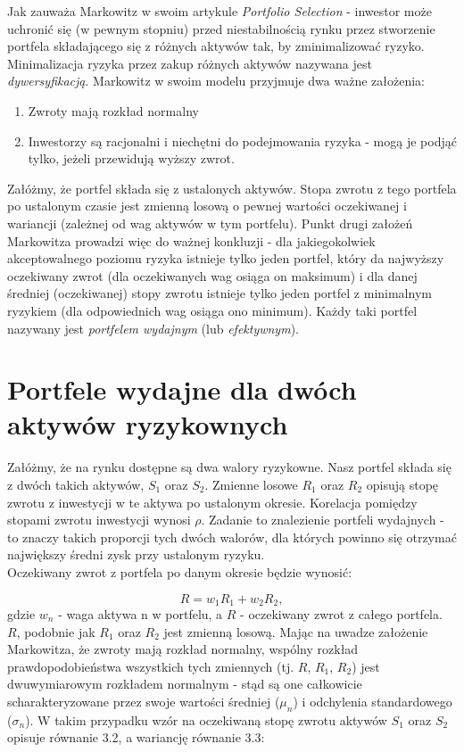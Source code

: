 \documentclass[magister]{dyplom}
\begin{document}
Jak zauważa Markowitz w swoim artykule \textit{Portfolio Selection} - inwestor może uchronić się (w pewnym stopniu) przed niestabilnością rynku przez stworzenie portfela składającego się z różnych aktywów tak, by zminimalizować ryzyko. Minimalizacja ryzyka przez zakup różnych aktywów nazywana jest \textit{dywersyfikacją}. Markowitz w swoim modelu przyjmuje dwa ważne założenia: 

\begin{enumerate}
	\item Zwroty mają rozkład normalny
	\item Inwestorzy są racjonalni i niechętni do podejmowania ryzyka - mogą je podjąć tylko, jeżeli przewidują wyższy zwrot.
\end{enumerate}

Załóżmy, że portfel składa się z ustalonych aktywów. Stopa zwrotu z tego portfela po ustalonym czasie jest zmienną losową o pewnej wartości oczekiwanej i wariancji (zależnej od wag aktywów w tym portfelu).
Punkt drugi założeń Markowitza prowadzi więc do ważnej konkluzji - dla jakiegokolwiek akceptowalnego poziomu ryzyka istnieje tylko jeden portfel, który da najwyższy oczekiwany zwrot (dla oczekiwanych wag osiąga on maksimum) i dla danej średniej (oczekiwanej) stopy zwrotu istnieje tylko jeden portfel z minimalnym ryzykiem (dla odpowiednich wag osiąga ono minimum). Każdy taki portfel nazywany jest \textit{portfelem wydajnym} (lub \textit{efektywnym}).\par

\section{Portfele wydajne dla dwóch aktywów ryzykownych} 

Załóżmy, że na rynku dostępne są dwa walory ryzykowne. Nasz portfel składa się z dwóch takich aktywów, $S_1$ oraz $S_2$. Zmienne losowe $R_1$ oraz $R_2$ opisują stopę zwrotu z inwestycji w te aktywa po ustalonym okresie. Korelacja pomiędzy stopami zwrotu inwestycji wynosi $\rho$. Zadanie to znalezienie portfeli wydajnych - to znaczy takich proporcji tych dwóch walorów, dla których powinno się otrzymać największy średni zysk przy ustalonym ryzyku.\\
Oczekiwany zwrot z portfela po danym okresie będzie wynosić:

\begin{equation}
	R = w_1R_1 + w_2R_2,
\end{equation}
gdzie $w_n$ - waga aktywa n w portfelu, a $R$ - oczekiwany zwrot z całego portfela.\\
$R$, podobnie jak $R_1$ oraz $R_2$ jest zmienną losową. Mając na uwadze założenie Markowitza, że zwroty mają rozkład normalny, wspólny rozkład prawdopodobieństwa wszystkich tych zmiennych (tj. $R$, $R_1$, $R_2$) jest dwuwymiarowym rozkładem normalnym - stąd są one całkowicie scharakteryzowane przez swoje wartości średniej ($\mu_n$) i odchylenia standardowego ($\sigma_n$). W takim przypadku wzór na oczekiwaną stopę zwrotu aktywów $S_1$ oraz $S_2$ opisuje równanie 3.2, a wariancję równanie 3.3:
\end{document}
